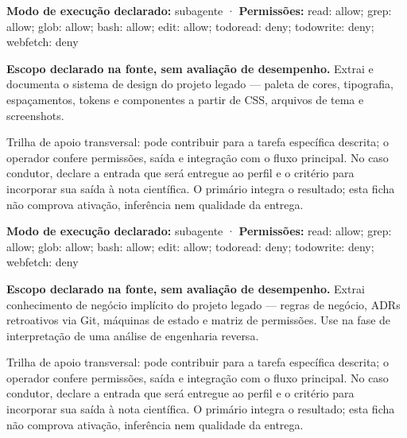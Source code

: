 \begin{arquitetura}
\textbf{Modo de execução declarado:} subagente · \textbf{Permissões:} read: allow; grep: allow; glob: allow; bash: allow; edit: allow; todoread: deny; todowrite: deny; webfetch: deny
\end{arquitetura}


\begin{descricao}
\textbf{Escopo declarado na fonte, sem avaliação de desempenho.}
Extrai e documenta o sistema de design do projeto legado — paleta de cores, tipografia, espaçamentos, tokens e componentes a partir de CSS, arquivos de tema e screenshots.
\end{descricao}

\begin{funcao}
Trilha de apoio transversal: pode contribuir para a tarefa específica descrita; o operador confere permissões, saída e integração com o fluxo principal. No caso condutor, declare a entrada que será entregue ao perfil e o critério para incorporar sua saída à nota científica. O primário integra o resultado; esta ficha não comprova ativação, inferência nem qualidade da entrega.
\end{funcao}

\begin{arquitetura}
\textbf{Modo de execução declarado:} subagente · \textbf{Permissões:} read: allow; grep: allow; glob: allow; bash: allow; edit: allow; todoread: deny; todowrite: deny; webfetch: deny
\end{arquitetura}


\begin{descricao}
\textbf{Escopo declarado na fonte, sem avaliação de desempenho.}
Extrai conhecimento de negócio implícito do projeto legado — regras de negócio, ADRs retroativos via Git, máquinas de estado e matriz de permissões. Use na fase de interpretação de uma análise de engenharia reversa.
\end{descricao}

\begin{funcao}
Trilha de apoio transversal: pode contribuir para a tarefa específica descrita; o operador confere permissões, saída e integração com o fluxo principal. No caso condutor, declare a entrada que será entregue ao perfil e o critério para incorporar sua saída à nota científica. O primário integra o resultado; esta ficha não comprova ativação, inferência nem qualidade da entrega.
\end{funcao}


